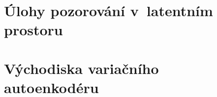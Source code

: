 \documentclass[11pt,a4paper]{report}
\let\openright=\clearpage
\begin{document}


\setcounter{tocdepth}{2}
\tableofcontents

\openright
\listoffigures


% 

\pagestyle{fancyx}
{%
\pagestyle{plain}

}

\chapter{Úlohy pozorování v~latentním prostoru}
\label{chap:applications}



\chapter{Východiska variačního autoenkodéru}
\label{chap:prereqs}








\end{document}
